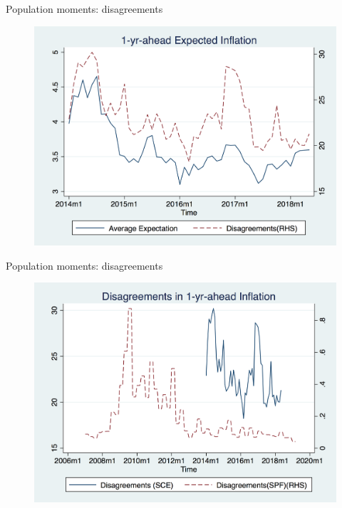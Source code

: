 \documentclass{beamer}
\begin{document}
\begin{frame}{Population moments: disagreements}
\begin{figure}
	\includegraphics[scale=0.3]{figures/mean_diag.png} 
\end{figure}
\end{frame}


\begin{frame}{Population moments: disagreements}
\begin{figure}
	\includegraphics[scale=0.3]{figures/disg_disg.png} 
\end{figure}
\end{frame}
\end{document}
